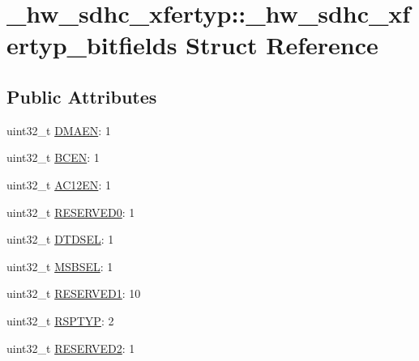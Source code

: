 \hypertarget{struct__hw__sdhc__xfertyp_1_1__hw__sdhc__xfertyp__bitfields}{}\section{\+\_\+hw\+\_\+sdhc\+\_\+xfertyp\+:\+:\+\_\+hw\+\_\+sdhc\+\_\+xfertyp\+\_\+bitfields Struct Reference}
\label{struct__hw__sdhc__xfertyp_1_1__hw__sdhc__xfertyp__bitfields}
\subsection*{Public Attributes}
\begin{DoxyCompactItemize}
\item 
uint32\+\_\+t \hyperlink{struct__hw__sdhc__xfertyp_1_1__hw__sdhc__xfertyp__bitfields_af41f929f673d81b93a69cea8a0451471}{D\+M\+A\+EN}\+: 1
\item 
uint32\+\_\+t \hyperlink{struct__hw__sdhc__xfertyp_1_1__hw__sdhc__xfertyp__bitfields_a7cee5987f114d5c03b643d4c75dd9dd1}{B\+C\+EN}\+: 1
\item 
uint32\+\_\+t \hyperlink{struct__hw__sdhc__xfertyp_1_1__hw__sdhc__xfertyp__bitfields_a87f55fb03806337eb2884fd77a27ef1a}{A\+C12\+EN}\+: 1
\item 
uint32\+\_\+t \hyperlink{struct__hw__sdhc__xfertyp_1_1__hw__sdhc__xfertyp__bitfields_ab9e5273100f33eaa91699f614f73b4f9}{R\+E\+S\+E\+R\+V\+E\+D0}\+: 1
\item 
uint32\+\_\+t \hyperlink{struct__hw__sdhc__xfertyp_1_1__hw__sdhc__xfertyp__bitfields_a07c4bd2d61bace16ebf3596cdf49ec82}{D\+T\+D\+S\+EL}\+: 1
\item 
uint32\+\_\+t \hyperlink{struct__hw__sdhc__xfertyp_1_1__hw__sdhc__xfertyp__bitfields_a49b60aa1026a80eeda073d67a49a473e}{M\+S\+B\+S\+EL}\+: 1
\item 
uint32\+\_\+t \hyperlink{struct__hw__sdhc__xfertyp_1_1__hw__sdhc__xfertyp__bitfields_a703165228f387a1a4a8c8e19b1957e2a}{R\+E\+S\+E\+R\+V\+E\+D1}\+: 10
\item 
uint32\+\_\+t \hyperlink{struct__hw__sdhc__xfertyp_1_1__hw__sdhc__xfertyp__bitfields_a5a9a23aebe33f6606b6b85f3a209b194}{R\+S\+P\+T\+YP}\+: 2
\item 
uint32\+\_\+t \hyperlink{struct__hw__sdhc__xfertyp_1_1__hw__sdhc__xfertyp__bitfields_a116a3e3bf2b8ee9853ffd9f9d2e47faa}{R\+E\+S\+E\+R\+V\+E\+D2}\+: 1
\item 

\end{DoxyCompactItemize}
